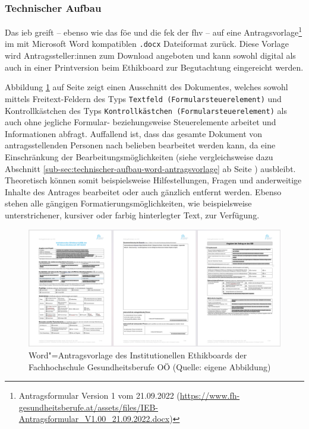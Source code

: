 \documentclass[a4paper,12pt,twoside]{scrreprt}
\begin{document}
\subsubsection*{Technischer Aufbau}
\label{sub-sub-sec:fh-oö-technischer-aufbau}

Das \ac{ieb} greift -- ebenso wie das \ac{föe} und die \ac{fek} der \ac{fhv} -- auf eine Antragsvorlage\footnote{Antragsformular Version 1 vom 21.09.2022 (\url{https://www.fh-gesundheitsberufe.at/assets/files/IEB-Antragsformular_V1.00_21.09.2022.docx})} im mit Microsoft Word kompatiblen \texttt{.docx} Dateiformat zurück. Diese Vorlage wird Antragssteller:innen zum Download angeboten und kann sowohl digital als auch in einer Printversion beim Ethikboard zur Begutachtung eingereicht werden. \cite{fh_gesundheitsberufe_oo_gmbh_einreichung_2023}

\medskip

Abbildung \ref{fig:dokumentenvorlage-ieb} auf Seite \pageref{fig:dokumentenvorlage-ieb} zeigt einen Ausschnitt des Dokumentes, welches sowohl mittels Freitext-Feldern des Typs \texttt{Textfeld (Formularsteuerelement)} und Kontrollkästchen des Typs \texttt{Kontrollkästchen (Formularsteuerelement)} als auch ohne jegliche Formular- beziehungsweise Steuerelemente arbeitet und Informationen abfragt. Auffallend ist, dass das gesamte Dokument von antragsstellenden Personen nach belieben bearbeitet werden kann, da eine Einschränkung der Bearbeitungsmöglichkeiten (siehe vergleichsweise dazu Abschnitt \ref{sub-sec:technischer-aufbau-word-antragsvorlage} ab Seite \pageref{sub-sec:technischer-aufbau-word-antragsvorlage}) ausbleibt. Theoretisch können somit beispielsweise Hilfestellungen, Fragen und anderweitige Inhalte des Antrages bearbeitet oder auch gänzlich entfernt werden. Ebenso stehen alle gängigen Formatierungsmöglichkeiten, wie beispielsweise unterstrichener, kursiver oder farbig hinterlegter Text, zur Verfügung.

\begin{figure}[ht]
    \centering
    \includegraphics[scale=0.21]{thesis/images/Luidold_Word-Vorlage-IEB-FH-Gesundheitsberufe-OOE.png}
    \caption[Word"=Antragsvorlage des Institutionellen Ethikboards der Fachhochschule Gesundheitsberufe OÖ]{Word"=Antragsvorlage des Institutionellen Ethikboards der Fachhochschule Gesundheitsberufe OÖ (Quelle: eigene Abbildung)}
    \label{fig:dokumentenvorlage-ieb}
\end{figure}
\end{document}

